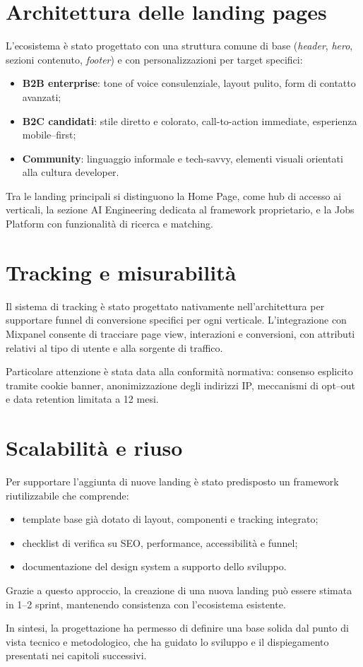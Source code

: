 \section{Architettura delle landing pages}
L’ecosistema è stato progettato con una struttura comune di base
(\textit{header}, \textit{hero}, sezioni contenuto, \textit{footer}) e con
personalizzazioni per target specifici:

\begin{itemize}
  \item \textbf{B2B enterprise}: tone of voice consulenziale, layout pulito,
  form di contatto avanzati;
  \item \textbf{B2C candidati}: stile diretto e colorato, call-to-action
  immediate, esperienza mobile–first;
  \item \textbf{Community}: linguaggio informale e tech-savvy, elementi visuali
  orientati alla cultura developer.
\end{itemize}

Tra le landing principali si distinguono la Home Page, come hub di accesso ai
verticali, la sezione AI Engineering dedicata al framework proprietario, e la
Jobs Platform con funzionalità di ricerca e matching.

\section{Tracking e misurabilità}
Il sistema di tracking è stato progettato nativamente nell’architettura per
supportare funnel di conversione specifici per ogni verticale. L’integrazione con
Mixpanel consente di tracciare page view, interazioni e conversioni, con
attributi relativi al tipo di utente e alla sorgente di traffico.

Particolare attenzione è stata data alla conformità normativa:
consenso esplicito tramite cookie banner, anonimizzazione degli indirizzi IP,
meccanismi di opt–out e data retention limitata a 12 mesi.

\section{Scalabilità e riuso}
Per supportare l’aggiunta di nuove landing è stato predisposto un framework
riutilizzabile che comprende:

\begin{itemize}
  \item template base già dotato di layout, componenti e tracking integrato;
  \item checklist di verifica su SEO, performance, accessibilità e funnel;
  \item documentazione del design system a supporto dello sviluppo.
\end{itemize}

Grazie a questo approccio, la creazione di una nuova landing può essere stimata
in 1–2 sprint, mantenendo consistenza con l’ecosistema esistente.

\bigskip
In sintesi, la progettazione ha permesso di definire una base solida dal punto di
vista tecnico e metodologico, che ha guidato lo sviluppo e il dispiegamento
presentati nei capitoli successivi.
